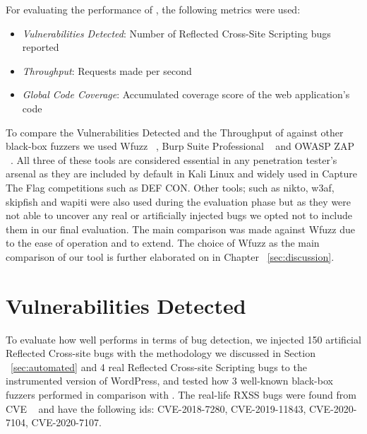For evaluating the performance of \pname{}, the following metrics were used:
\begin{itemize}
	\item \emph{Vulnerabilities Detected}: Number of Reflected Cross-Site Scripting bugs reported
	\item \emph{Throughput}: Requests made per second
	\item \emph{Global Code Coverage}: Accumulated coverage score of the web application's code
\end{itemize}

To compare the Vulnerabilities Detected and the Throughput of \pname{} against other black-box fuzzers we used Wfuzz ~\cite{wfuzz}, Burp Suite Professional ~\cite{burp} and OWASP ZAP ~\cite{ owaspzap}. All three of these tools are considered essential in any penetration tester's arsenal as they are included by default in Kali Linux and widely used in Capture The Flag competitions such as DEF CON. Other tools; such as nikto, w3af, skipfish and wapiti were also used during the evaluation phase but as they were not able to uncover any real or artificially injected bugs we opted not to include them in our final evaluation. The main comparison was made against Wfuzz due to the ease of operation and to extend. The choice of Wfuzz as the main comparison of our tool is further elaborated on in Chapter ~\ref{sec:discussion}.

\section{Vulnerabilities Detected}
To evaluate how well \pname{} performs in terms of bug detection, we injected 150 artificial  Reflected Cross-site bugs with the methodology we discussed in Section ~\ref{sec:automated} and 4 real Reflected Cross-site Scripting bugs to the instrumented version of WordPress, and tested how 3 well-known black-box fuzzers performed in comparison with \pname{}. The real-life RXSS bugs were found from CVE ~\cite{cve} and have the following ids: CVE-2018-7280, CVE-2019-11843, CVE-2020-7104, CVE-2020-7107.

